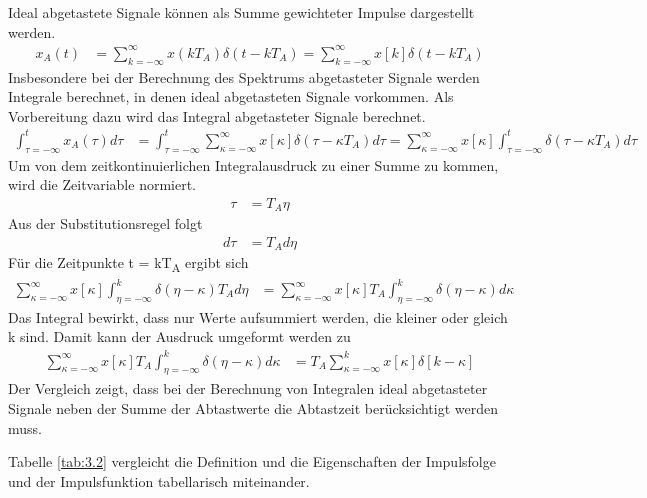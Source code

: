 Ideal abgetastete Signale können als Summe gewichteter Impulse dargestellt werden.
\begin{align}
x_{A}(t) &= \sum\limits_{k = - \infty}^{\infty}{x\left( k  T_{A} \right)  \delta\left( t - k  T_{A} \right)} = \sum\limits_{k = - \infty}^{\infty}{x[ k]  \delta\left( t - k  T_{A} \right)} \label{eq:3.27}
\end{align}
Insbesondere bei der Berechnung des Spektrums abgetasteter Signale werden Integrale berechnet, in denen ideal abgetasteten Signale vorkommen. Als Vorbereitung dazu wird das Integral abgetasteter Signale berechnet.
\begin{align}
\int_{\tau = - \infty}^{t}{x_{A}(\tau)d\tau} &= \int_{\tau = - \infty}^{t}{\sum\limits_{\kappa = - \infty}^{\infty}{x[\kappa]  \delta\left( \tau - \kappa  T_{A} \right)}d\tau} = \sum\limits_{\kappa = - \infty}^{\infty}{x[\kappa]  \int_{\tau = - \infty}^{t}{\delta\left( \tau - \kappa  T_{A} \right)d\tau}} \label{eq:3.28}
\end{align}
Um von dem zeitkontinuierlichen Integralausdruck zu einer Summe zu kommen, wird die Zeitvariable normiert.
\begin{align}
\tau &= T_{A}  \eta \label{eq:3.29}
\end{align}
Aus der Substitutionsregel folgt
\begin{align}
d\tau &= T_{A}  d\eta \label{eq:3.30}
\end{align}
Für die Zeitpunkte t = kT\textsubscript{A} ergibt sich
\begin{align}
\sum\limits_{\kappa = - \infty}^{\infty}{x[\kappa]\int_{\eta = - \infty}^{k}{\delta(\eta - \kappa)  T_{A}d\eta}} &= \sum\limits_{\kappa = - \infty}^{\infty}{x[\kappa]  T_{A}  \int_{\eta = - \infty}^{k}{\delta(\eta - \kappa)d\kappa}} \label{eq:3.31}
\end{align}
Das Integral bewirkt, dass nur Werte aufsummiert werden, die kleiner oder gleich k sind. Damit kann der Ausdruck umgeformt werden zu
\begin{align}
\sum\limits_{\kappa = - \infty}^{\infty}{x[\kappa]  T_{A}  \int_{\eta = - \infty}^{k}{\delta(\eta - \kappa)d\kappa}} &= T_{A}  \sum\limits_{\kappa = - \infty}^{k}{x[\kappa]  \delta[ k - \kappa]} \label{eq:3.32}
\end{align}
Der Vergleich zeigt, dass bei der Berechnung von Integralen ideal abgetasteter Signale neben der Summe der Abtastwerte die Abtastzeit berücksichtigt werden muss.

Tabelle \ref{tab:3.2} vergleicht die Definition und die Eigenschaften der Impulsfolge und der Impulsfunktion tabellarisch miteinander.

